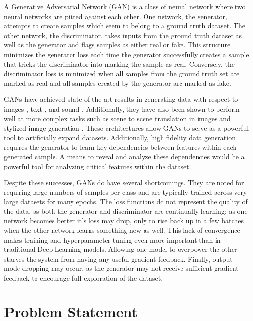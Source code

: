 A Generative Adversarial Network (GAN) is a class of neural network where two neural networks are pitted against each other. One network, the generator, attempts to create samples which seem to belong to a ground truth dataset. The other network, the discriminator, takes inputs from the ground truth dataset as well as the generator and flags samples as either real or fake. This structure minimizes the generator loss each time the generator successfully creates a sample that tricks the discriminator into marking the sample as real. Conversely, the discriminator loss is minimized when all samples from the ground truth set are marked as real and all samples created by the generator are marked as fake.

GANs have achieved state of the art results in generating data with respect to images \cite {Karras2018, Zhu2017, Ledig2016}, text \cite{Su2018}, and sound \cite{Dong2018, Gao2018}.  Additionally, they have also been shown to perform well at more complex tasks such as scene to scene translation in images \cite{Zhu2017, Choi2017} and stylized image generation \cite{Karras2018}. These architectures allow GANs to serve as a powerful tool to artificially expand datasets. Additionally, high fidelity data generation requires the generator to learn key dependencies between features within each generated sample. A means to reveal and analyze these dependencies would be a powerful tool for analyzing critical features within the dataset.

Despite these successes, GANs do have several shortcomings. They are noted for requiring large numbers of samples per class and are typically trained across very large datasets for many epochs. The loss functions do not represent the quality of the data, as both the generator and discriminator are continually learning; as one network becomes better it's loss may drop, only to rise back up in a few batches when the other network learns something new as well. This lack of convergence makes training and hyperparameter tuning even more important than in traditional Deep Learning models. Allowing one model to overpower the other starves the system from having any useful gradient feedback. Finally, output mode dropping may occur, as the generator may not receive sufficient gradient feedback to encourage full exploration of the dataset.

\section{Problem Statement}

